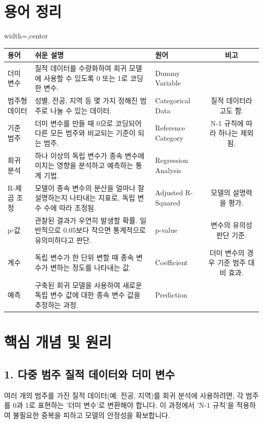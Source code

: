 \documentclass[11pt,a4paper]{article}
\begin{document}
\newpage
\section*{용어 정리}

\begin{adjustbox}{width=\textwidth,center}
\begin{tabular}{lllc}
\toprule
\textbf{용어} & \textbf{쉬운 설명} & \textbf{원어} & \textbf{비고} \\
\midrule
더미 변수 & 질적 데이터를 수량화하여 회귀 모델에 사용할 수 있도록 0 또는 1로 코딩한 변수. & Dummy Variable & \\
범주형 데이터 & 성별, 전공, 지역 등 몇 가지 정해진 범주로 나눌 수 있는 데이터. & Categorical Data & 질적 데이터라고도 함. \\
기준 범주 & 더미 변수를 만들 때 0으로 코딩되어 다른 모든 범주와 비교되는 기준이 되는 범주. & Reference Category & N-1 규칙에 따라 하나는 제외됨. \\
회귀 분석 & 하나 이상의 독립 변수가 종속 변수에 미치는 영향을 분석하고 예측하는 통계 기법. & Regression Analysis & \\
R-제곱 조정 & 모델이 종속 변수의 분산을 얼마나 잘 설명하는지 나타내는 지표로, 독립 변수 수에 따라 조정됨. & Adjusted R-Squared & 모델의 설명력을 평가. \\
p-값 & 관찰된 결과가 우연히 발생할 확률. 일반적으로 0.05보다 작으면 통계적으로 유의미하다고 판단. & p-value & 변수의 유의성 판단 기준. \\
계수 & 독립 변수가 한 단위 변할 때 종속 변수가 변하는 정도를 나타내는 값. & Coefficient & 더미 변수의 경우 기준 범주 대비 효과. \\
예측 & 구축된 회귀 모델을 사용하여 새로운 독립 변수 값에 대한 종속 변수 값을 추정하는 과정. & Prediction & \\
\bottomrule
\end{tabular}
\end{adjustbox}

\newpage
\section*{핵심 개념 및 원리}

\subsection*{1. 다중 범주 질적 데이터와 더미 변수}

\begin{tcolorbox}[definition={핵심 요약: 다중 범주 더미 변수}]
여러 개의 범주를 가진 질적 데이터(예: 전공, 지역)를 회귀 분석에 사용하려면, 각 범주를 0과 1로 표현하는 '더미 변수'로 변환해야 합니다. 이 과정에서 'N-1 규칙'을 적용하여 불필요한 중복을 피하고 모델의 안정성을 확보합니다.
\end{tcolorbox}
\end{document}
